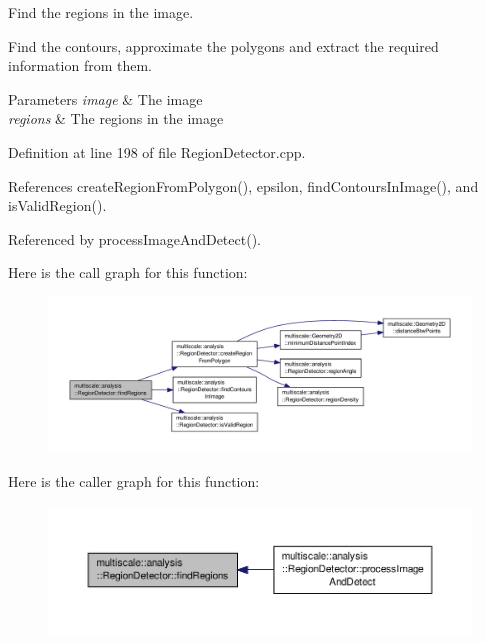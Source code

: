 Find the regions in the image. 

Find the contours, approximate the polygons and extract the required information from them.


\begin{DoxyParams}{Parameters}
{\em image} & The image \\
\hline
{\em regions} & The regions in the image \\
\hline
\end{DoxyParams}


Definition at line 198 of file Region\-Detector.\-cpp.



References create\-Region\-From\-Polygon(), epsilon, find\-Contours\-In\-Image(), and is\-Valid\-Region().



Referenced by process\-Image\-And\-Detect().



Here is the call graph for this function\-:\nopagebreak
\begin{figure}[H]
\begin{center}
\leavevmode
\includegraphics[width=350pt]{classmultiscale_1_1analysis_1_1RegionDetector_a886ec5ee1cd2fd816c1cfd4e2ea6778e_cgraph}
\end{center}
\end{figure}




Here is the caller graph for this function\-:\nopagebreak
\begin{figure}[H]
\begin{center}
\leavevmode
\includegraphics[width=350pt]{classmultiscale_1_1analysis_1_1RegionDetector_a886ec5ee1cd2fd816c1cfd4e2ea6778e_icgraph}
\end{center}
\end{figure}


